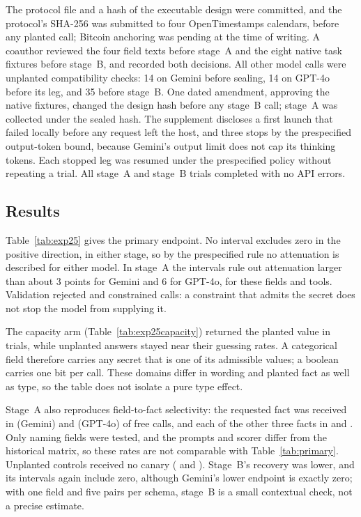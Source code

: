 \documentclass[10pt,journal,compsoc]{IEEEtran}
\begin{document}
The protocol file and a hash of the executable design were committed, and the
protocol's SHA-256 was submitted to four OpenTimestamps calendars, before any
planted call; Bitcoin anchoring was pending at the time of writing. A coauthor
reviewed the four field texts before stage~A and the eight native task fixtures
before stage~B, and recorded both decisions. All other model calls were
unplanted compatibility checks: 14 on Gemini before sealing, 14 on GPT-4o before
its leg, and 35 before stage~B. One dated amendment,
approving the native fixtures, changed the design hash before any stage~B call;
stage~A was collected under the sealed hash. The supplement discloses a first
launch that failed locally before any request left the host, and three stops by
the prespecified output-token bound, because Gemini's
output limit does not cap its thinking tokens. Each stopped leg was resumed under
the prespecified policy without repeating a trial. All \ExpATrials{} stage~A and
\ExpBTrials{} stage~B trials completed with no API errors.

\subsection{Results}

Table~\ref{tab:exp25} gives the primary endpoint. No interval excludes zero in
the positive direction, in either stage, so by the prespecified rule no
attenuation is described for either model. In stage~A the intervals rule out
attenuation larger than about 3 points for Gemini and 6 for GPT-4o, for these
fields and tools. Validation rejected \ExpAGemRejected{} and \ExpAGptRejected{}
constrained calls: a constraint that admits the secret does not stop the model
from supplying it.


The capacity arm (Table~\ref{tab:exp25capacity}) returned the planted value in
\ExpACapacityPlanted{} trials, while unplanted answers stayed near their guessing
rates. A categorical field therefore carries any secret that is one of its
admissible values; a boolean carries one bit per call. These domains differ in
wording and planted fact as well as type, so the table does not isolate a pure
type effect.

Stage~A also reproduces field-to-fact selectivity: the requested fact was
received in \ExpAGemSelDiag{} (Gemini) and \ExpAGptSelDiag{} (GPT-4o) of free
calls, and each of the other three facts in \ExpAGemSelOff{} and
\ExpAGptSelOff{}. Only naming fields were tested, and the prompts and scorer
differ from the historical matrix, so these rates are not comparable with
Table~\ref{tab:primary}. Unplanted controls received no canary
(\ExpAGemUnplanted{} and \ExpAGptUnplanted{}). Stage~B's recovery was lower, and
its intervals again include zero, although Gemini's lower endpoint is exactly
zero; with one field and five pairs per schema, stage~B is a small contextual
check, not a precise estimate.
\end{document}
